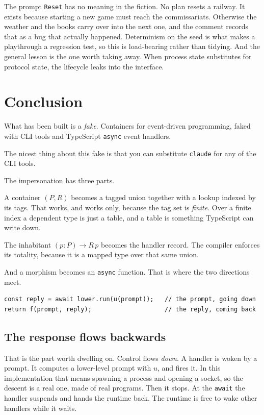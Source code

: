 \documentclass[11pt,a4paper]{article}
\begin{document}
The prompt \texttt{Reset} has no meaning in the fiction. No plan resets a railway. It exists because starting
a new game must reach the commissariats. Otherwise the weather and the books carry over into the
next one, and the comment records that as a bug that actually happened. Determinism on the seed is
what makes a playthrough a regression test, so this is load-bearing rather than tidying. And the
general lesson is the one worth taking away. When process state substitutes for protocol state, the
lifecycle leaks into the interface.

\newpage

\section*{Conclusion}

\begin{sectionbox}
What has been built is a \emph{fake}. Containers for event-driven programming, faked with CLI
tools and TypeScript \texttt{async} event handlers.

The nicest thing about this fake is that you can substitute \texttt{claude} for any of the CLI
tools.
\end{sectionbox}

The impersonation has three parts.

A container $(P, R)$ becomes a tagged union together with a lookup indexed by its tags. That works,
and works only, because the tag set is \emph{finite}. Over a finite index a dependent type is just
a table, and a table is something TypeScript can write down.

The inhabitant $(p : P) \to R\,p$ becomes the handler record. The compiler enforces its totality,
because it is a mapped type over that same union.

And a morphism becomes an \texttt{async} function. That is where the two directions meet.

\begin{lstlisting}[language=TS]
const reply = await lower.run(u(prompt));   // the prompt, going down
return f(prompt, reply);                    // the reply, coming back
\end{lstlisting}

\subsection{The response flows backwards}

That is the part worth dwelling on. Control flows \emph{down}. A handler is woken by a prompt. It
computes a lower-level prompt with $u$, and fires it. In this implementation that means spawning a
process and opening a socket, so the descent is a real one, made of real programs. Then it stops.
At the \texttt{await} the handler suspends and hands the runtime back. The runtime is free to wake
other handlers while it waits.
\end{document}
